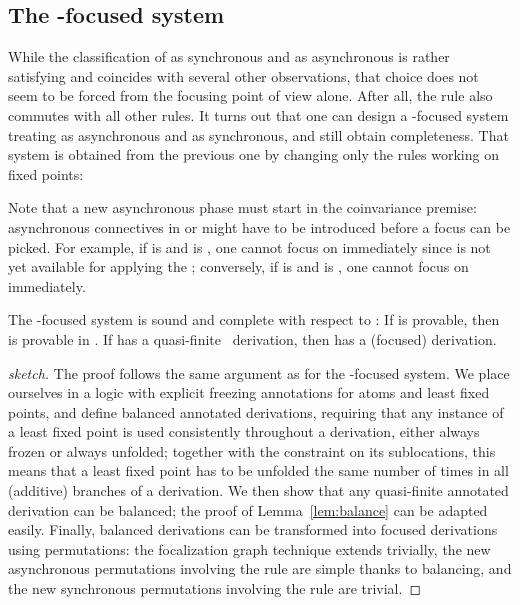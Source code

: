 \subsection{The -focused system}
\label{sec:nufoc}

While the classification of  as synchronous and  as
asynchronous is rather satisfying and coincides with several other observations,
that choice does not seem to be forced from the focusing point of view alone.
After all, the  rule also commutes with all other rules.
It turns out that one can design a -focused system
treating  as asynchronous and  as synchronous,
and still obtain completeness.
That system is obtained from the previous one by changing only
the rules working on fixed points:


Note that a new asynchronous phase must start in the coinvariance premise:
asynchronous connectives in  or  might have to be
introduced before a focus can be picked.
For example, if  is  and
 is , one cannot focus on  immediately
since  is not yet available for applying the ;
conversely, if  is  and  is
, one cannot focus on  immediately.

\begin{theorem}
The -focused system is sound and complete with respect to \mumall:
If  is provable, then 
  is provable in \mumall.
If  has a quasi-finite \mumall\ derivation,
  then  has a (focused) derivation.
\end{theorem}

\begin{proof}[sketch]
The proof follows the same argument as for the -focused system.
We place ourselves in a logic with explicit freezing annotations
for atoms and least fixed points,
and define balanced annotated derivations, requiring
that any instance of a least fixed point is used consistently throughout
a derivation, either always frozen or always unfolded;
together with the constraint on its sublocations, this means that
a least fixed point has to be unfolded the same number of times in
all (additive) branches of a derivation.
We then show that any quasi-finite annotated derivation can be balanced;
the proof of Lemma~\ref{lem:balance} can be adapted easily.
Finally, balanced derivations can be transformed into focused
derivations using permutations: the focalization graph technique
extends trivially, the new asynchronous permutations involving the
 rule are simple thanks to balancing, and the new synchronous
permutations involving the  rule are trivial.
\end{proof}

